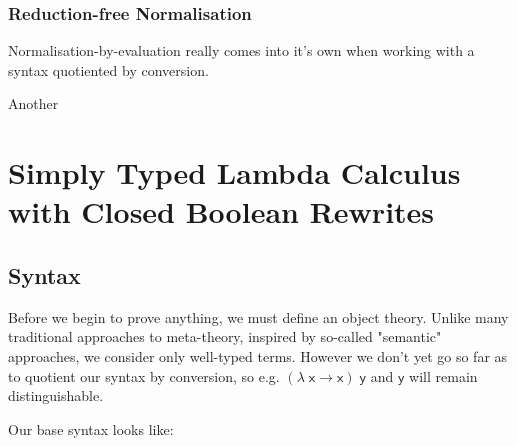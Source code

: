 \documentclass[
    a4paper, %
    fontsize=9.5pt, %
    twoside=false, %
	numbers=noenddot, %
	fontmethod=tex, %
]{kaobook}
\newcommand{\Varid}[1]{\mathit{#1}}
\renewcommand\Varid[1]{\mathord{\textsf{#1}}}
\begin{document}
\subsection{Reduction-free Normalisation}

Normalisation-by-evaluation really comes into it's own when working with a
syntax quotiented by conversion.

Another 


\setchapterpreamble[u]{\margintoc}

\chapter{Simply Typed Lambda Calculus with Closed Boolean Rewrites}

\section{Syntax}

Before we begin to prove anything, we must define an object theory.
Unlike many traditional approaches to meta-theory, inspired by so-called 
"semantic"  
approaches, we consider only well-typed terms. 
However we don't yet go so far as to quotient our syntax by conversion,
so e.g. \ensuremath{(\Varid{λ}\;\Varid{x}\;\Varid{→}\;\Varid{x})\;\Varid{y}} and \ensuremath{\Varid{y}} will remain distinguishable.

Our base syntax looks like:
\end{document}
